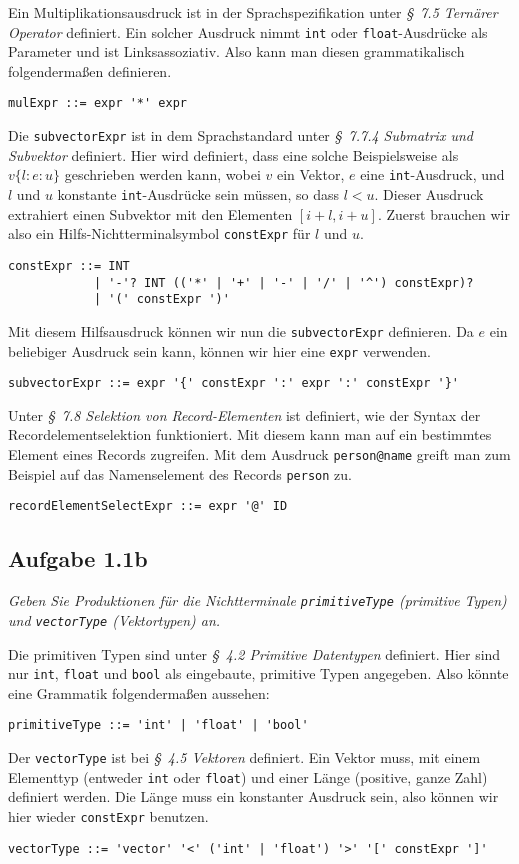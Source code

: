 \documentclass[
  ngerman,
  DIV=14
]{scrartcl}
\begin{document}
\bigskip\noindent
Ein Multiplikationsausdruck ist in der Sprachspezifikation unter \emph{§~7.5 Ternärer Operator} definiert. Ein solcher Ausdruck nimmt \verb|int| oder \verb|float|-Ausdrücke als Parameter und ist Linksassoziativ. Also kann man diesen grammatikalisch folgendermaßen definieren. 
\begin{lstlisting}
mulExpr ::= expr '*' expr
\end{lstlisting}
Die \verb|subvectorExpr| ist in dem Sprachstandard unter \emph{§~7.7.4 Submatrix und Subvektor} definiert. Hier wird definiert, dass eine solche Beispielsweise als $v\{l:e:u\}$ geschrieben werden kann, wobei $v$ ein Vektor, $e$ eine \texttt{int}-Ausdruck, und $l$ und $u$ konstante \texttt{int}-Ausdrücke sein müssen, so dass $l < u$. Dieser Ausdruck extrahiert einen Subvektor mit den Elementen $[i+l, i+u]$. Zuerst brauchen wir also ein Hilfs-Nichtterminalsymbol \texttt{constExpr} für $l$ und $u$.
\begin{lstlisting}
constExpr ::= INT
			| '-'? INT (('*' | '+' | '-' | '/' | '^') constExpr)?
            | '(' constExpr ')'
\end{lstlisting}
Mit diesem Hilfsausdruck können wir nun die \texttt{subvectorExpr} definieren. Da $e$ ein beliebiger Ausdruck sein kann, können wir hier eine \texttt{expr} verwenden. 
\begin{lstlisting}
subvectorExpr ::= expr '{' constExpr ':' expr ':' constExpr '}'  
\end{lstlisting}
Unter \emph{§~7.8 Selektion von Record-Elementen} ist definiert, wie der Syntax der Recordelementselektion funktioniert. Mit diesem kann man auf ein bestimmtes Element eines Records zugreifen. Mit dem Ausdruck \texttt{person@name} greift man zum Beispiel auf das Namenselement des Records \texttt{person} zu. 
\begin{lstlisting}
recordElementSelectExpr ::= expr '@' ID  
\end{lstlisting}

\subsection*{Aufgabe 1.1b}

\emph{Geben Sie Produktionen für die Nichtterminale \texttt{primitiveType} (primitive Typen) und \texttt{vectorType} (Vektortypen) an.}

\bigskip\noindent
Die primitiven Typen sind unter \emph{§~4.2 Primitive Datentypen} definiert. Hier sind nur \texttt{int}, \texttt{float} und \texttt{bool} als eingebaute, primitive Typen angegeben. Also könnte eine Grammatik folgendermaßen aussehen:
\begin{lstlisting}
primitiveType ::= 'int' | 'float' | 'bool'
\end{lstlisting}
Der \texttt{vectorType} ist bei \emph{§~4.5 Vektoren} definiert. Ein Vektor muss, mit einem Elementtyp (entweder \texttt{int} oder \texttt{float}) und einer Länge (positive, ganze Zahl) definiert werden. Die Länge muss ein konstanter Ausdruck sein, also können wir hier wieder \texttt{constExpr} benutzen.
\begin{lstlisting}
vectorType ::= 'vector' '<' ('int' | 'float') '>' '[' constExpr ']'
\end{lstlisting}
\end{document}
